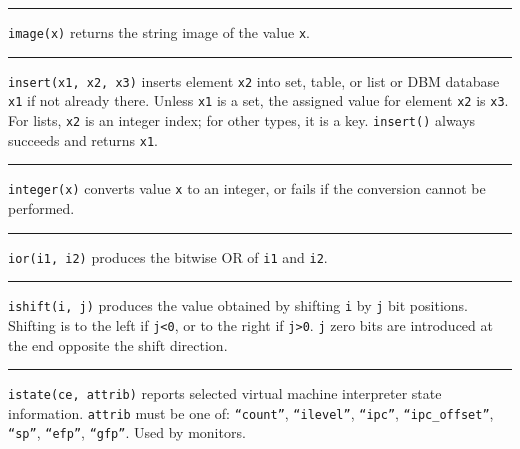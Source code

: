 \bigskip\hrule\vspace{0.1cm}

\noindent
{}\texttt{image(x)} returns the string image of the value
\texttt{x}.

\bigskip\hrule\vspace{0.1cm}

\noindent
\texttt{insert(x1, x2, x3)} inserts element \texttt{x2} into set, table,
or list or DBM database \texttt{x1} if not already there. Unless
\texttt{x1} is a set, the assigned value for element \texttt{x2} is
\texttt{x3}. For lists, \texttt{x2} is an integer index; for other
types, it is a key. \texttt{insert()} always succeeds
and returns \texttt{x1}.

\bigskip\hrule\vspace{0.1cm}

\noindent
{}\texttt{integer(x)} converts value \texttt{x}
to an integer, or fails if the conversion cannot be performed.

\bigskip\hrule\vspace{0.1cm}

\noindent
{}\texttt{ior(i1, i2)} produces the bitwise OR of
\texttt{i1} and \texttt{i2}.

\bigskip\hrule\vspace{0.1cm}

\noindent
{}\texttt{ishift(i, j)} produces the value obtained by
shifting \texttt{i} by \texttt{j} bit positions. Shifting is to the
left if \texttt{j{\textless}0}, or to the right if
\texttt{j{\textgreater}0}. \texttt{j} zero bits are introduced at the
end opposite the shift direction.

\bigskip\hrule\vspace{0.1cm}

\noindent
\texttt{istate(ce, attrib)} reports selected virtual machine interpreter
state information. \texttt{attrib} must be one of:
\texttt{{\textquotedblleft}count{\textquotedblright}},
\texttt{{\textquotedblleft}ilevel{\textquotedblright}},
\texttt{{\textquotedblleft}ipc{\textquotedblright}},
\texttt{{\textquotedblleft}ipc\_offset{\textquotedblright}},
\texttt{{\textquotedblleft}sp{\textquotedblright}},
\texttt{{\textquotedblleft}efp{\textquotedblright}},
\texttt{{\textquotedblleft}gfp{\textquotedblright}}. Used by monitors.

